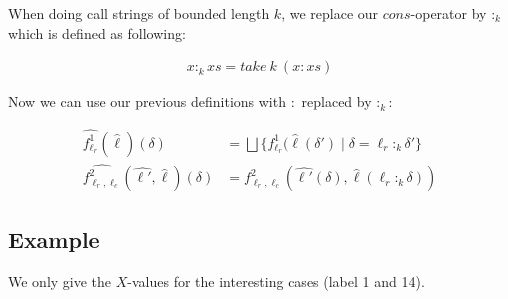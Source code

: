 \documentclass[a4wide,12pt]{article}
\theoremstyle{definition}
\theoremstyle{plain}
\theoremstyle{remark}
\begin{document}
When doing call strings of bounded length $k$, we replace our $cons$-operator by
$:_k$ which is defined as following:

\begin{align}
x :_k xs = take\ k\ (x : xs)
\end{align}

Now we can use our previous definitions with $:$ replaced by $:_k$:

\begin{align}
\widehat{f^1_{\ell_r}} (\widehat{\ell}) (\delta) & = \bigsqcup \{ f^1_{\ell_r} (\widehat{\ell}(\delta') \mid \delta = \ell_r :_k \delta' \} \\
\widehat{f^2_{\ell_r, \ell_c}} (\widehat{\ell'}, \widehat{\ell}) (\delta) & = f^2_{\ell_r, \ell_c} (\widehat{\ell'}(\delta), \widehat{\ell}(\ell_r :_k \delta))
\end{align}

\subsection{Example}
We only give the $X$-values for the interesting cases (label 1 and 14).
\end{document}

